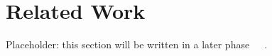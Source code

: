 \section{Related Work}\label{sec:related-work}

Placeholder: this section will be written in a later phase~\cite{HALX2026thx02}~\cite{Wang2025yoloe}~\cite{Sapkota2026yoloe26}.
